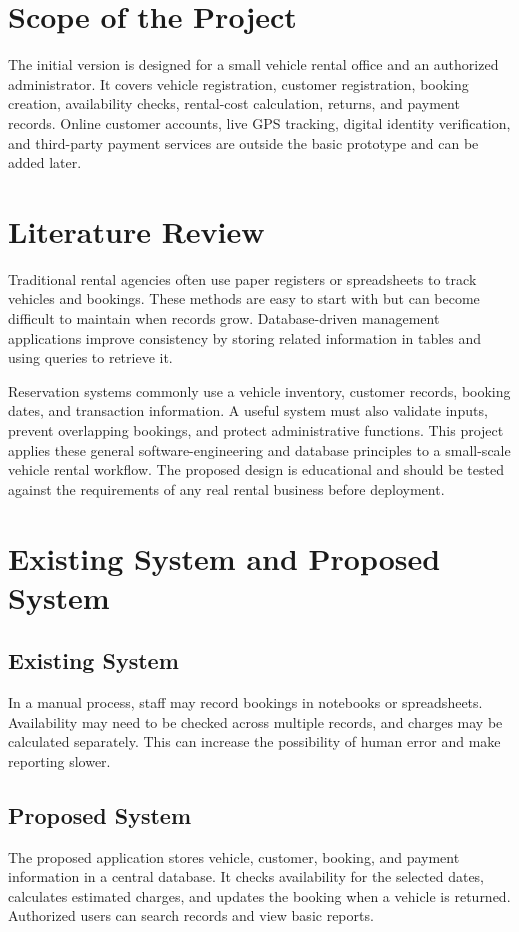 \documentclass[11pt,a4paper]{report}
\begin{document}
\section{Scope of the Project}
The initial version is designed for a small vehicle rental office and an authorized administrator. It covers vehicle registration, customer registration, booking creation, availability checks, rental-cost calculation, returns, and payment records. Online customer accounts, live GPS tracking, digital identity verification, and third-party payment services are outside the basic prototype and can be added later.

\section{Literature Review}
Traditional rental agencies often use paper registers or spreadsheets to track vehicles and bookings. These methods are easy to start with but can become difficult to maintain when records grow. Database-driven management applications improve consistency by storing related information in tables and using queries to retrieve it.

Reservation systems commonly use a vehicle inventory, customer records, booking dates, and transaction information. A useful system must also validate inputs, prevent overlapping bookings, and protect administrative functions. This project applies these general software-engineering and database principles to a small-scale vehicle rental workflow. The proposed design is educational and should be tested against the requirements of any real rental business before deployment.

\section{Existing System and Proposed System}
\subsection{Existing System}
In a manual process, staff may record bookings in notebooks or spreadsheets. Availability may need to be checked across multiple records, and charges may be calculated separately. This can increase the possibility of human error and make reporting slower.

\subsection{Proposed System}
The proposed application stores vehicle, customer, booking, and payment information in a central database. It checks availability for the selected dates, calculates estimated charges, and updates the booking when a vehicle is returned. Authorized users can search records and view basic reports.
\end{document}
